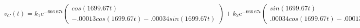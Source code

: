 \documentclass[preview]{standalone}
\begin{document}
\begin{center}
\[
                                                v_C(t) = k_1e^{-666.67t}
                                                \begin{pmatrix} 
                                                cos(1699.67t) \\ 
                                                -.00013cos(1699.67t) - .00034sin(1699.67t)
                                                \end{pmatrix} + k_2e^{-666.67t}
                                                \begin{pmatrix} 
                                                sin(1699.67t) \\ 
                                                .00034cos(1699.67t) - .00013sin(1699.67t)
                                                \end{pmatrix}
                                        \]
\end{center}
\end{document}
